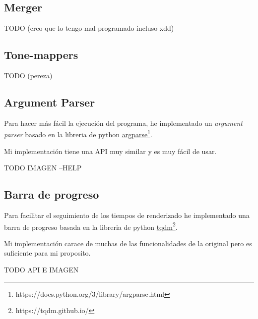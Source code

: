 \documentclass{article}
\begin{document}
\subsection{Merger}
TODO (creo que lo tengo mal programado incluso xdd)

\subsection{Tone-mappers}
TODO (pereza)

\subsection{Argument Parser}
Para hacer más fácil la ejecución del programa, he implementado un \textit{argument
parser} basado en la libreria de python
\href{https://docs.python.org/3/library/argparse.html}{argparse}\footnote{https://docs.python.org/3/library/argparse.html}.

Mi implementación tiene una API muy similar y es muy fácil de usar.

TODO IMAGEN --HELP

\subsection{Barra de progreso}
Para facilitar el seguimiento de los tiempos de renderizado he implementado una
barra de progreso basada en la libreria de python
\href{https://tqdm.github.io/}{tqdm}\footnote{https://tqdm.github.io/}.

Mi implementación carace de muchas de las funcionalidades de la original pero es
suficiente para mi proposito.

TODO API E IMAGEN
\end{document}
